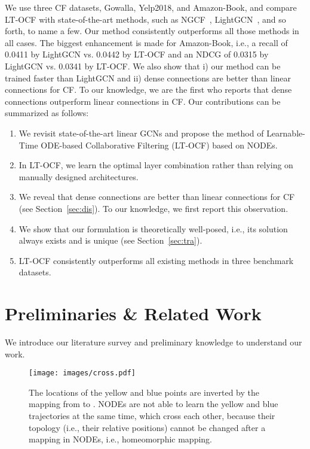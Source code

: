 \documentclass[sigconf]{acmart}
\begin{document}
We use three CF datasets, Gowalla, Yelp2018, and Amazon-Book, and compare LT-OCF with state-of-the-art methods, such as NGCF~\cite{10.1145/3331184.3331267}, LightGCN~\cite{10.1145/3397271.3401063}, and so forth, to name a few. Our method consistently outperforms all those methods in all cases. The biggest enhancement is made for Amazon-Book, i.e., a recall of 0.0411 by LightGCN vs. 0.0442 by LT-OCF and an NDCG of 0.0315 by LightGCN vs. 0.0341 by LT-OCF. We also show that i) our method can be trained faster than LightGCN and ii) dense connections are better than linear connections for CF. To our knowledge, we are the first who reports that dense connections outperform linear connections in CF. Our contributions can be summarized as follows:
\begin{enumerate}
    \item We revisit state-of-the-art linear GCNs and propose the method of Learnable-Time ODE-based Collaborative Filtering (LT-OCF) based on NODEs.
    \item In LT-OCF, we learn the optimal layer combination rather than relying on manually designed architectures.
    \item We reveal that dense connections are better than linear connections for CF (see Section~\ref{sec:dis}). To our knowledge, we first report this observation.
    \item We show that our formulation is theoretically well-posed, i.e., its solution always exists and is unique (see Section~\ref{sec:tra}).
    \item LT-OCF consistently outperforms all existing methods in three benchmark datasets.
\end{enumerate}


\section{Preliminaries \& Related Work}

We introduce our literature survey and preliminary knowledge to understand our work.

\begin{figure}
    \centering
    \texttt{[image: images/cross.pdf]}
    \caption{The locations of the yellow and blue points are inverted by the mapping from  to . NODEs are not able to learn the yellow and blue trajectories at the same time, which cross each other, because their topology (i.e., their relative positions) cannot be changed after a mapping in NODEs, i.e., homeomorphic mapping.}
    \label{fig:cross}
\end{figure}
\end{document}
